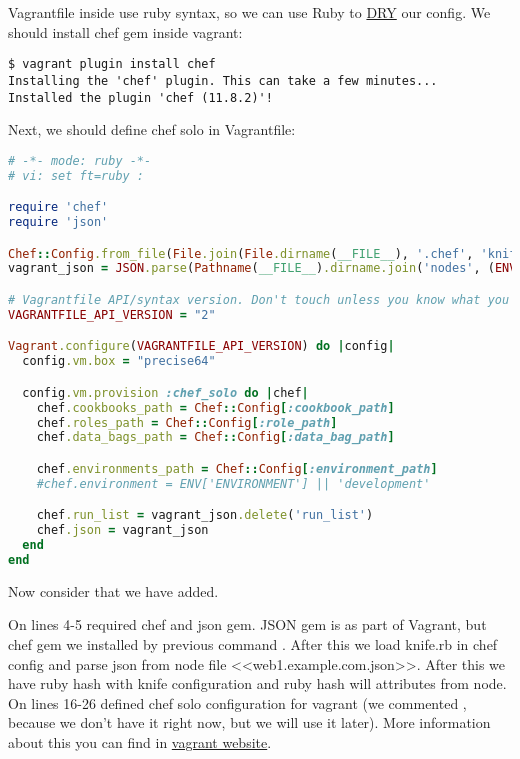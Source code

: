 Vagrantfile inside use ruby syntax, so we can use Ruby to \href{http://en.wikipedia.org/wiki/Dont\_repeat\_yourself}{DRY} our config. We should install chef gem inside vagrant:

\begin{lstlisting}[label=lst:my-cloud-vagrant6]
$ vagrant plugin install chef
Installing the 'chef' plugin. This can take a few minutes...
Installed the plugin 'chef (11.8.2)'!
\end{lstlisting}

Next, we should define chef solo in Vagrantfile:

\begin{lstlisting}[language=Ruby,label=lst:my-cloud-vagrant7,title=my-cloud/nodes/Vagrantfile]
# -*- mode: ruby -*-
# vi: set ft=ruby :

require 'chef'
require 'json'

Chef::Config.from_file(File.join(File.dirname(__FILE__), '.chef', 'knife.rb'))
vagrant_json = JSON.parse(Pathname(__FILE__).dirname.join('nodes', (ENV['NODE'] || 'web1.example.com.json')).read)

# Vagrantfile API/syntax version. Don't touch unless you know what you're doing!
VAGRANTFILE_API_VERSION = "2"

Vagrant.configure(VAGRANTFILE_API_VERSION) do |config|
  config.vm.box = "precise64"

  config.vm.provision :chef_solo do |chef|
    chef.cookbooks_path = Chef::Config[:cookbook_path]
    chef.roles_path = Chef::Config[:role_path]
    chef.data_bags_path = Chef::Config[:data_bag_path]

    chef.environments_path = Chef::Config[:environment_path]
    #chef.environment = ENV['ENVIRONMENT'] || 'development'

    chef.run_list = vagrant_json.delete('run_list')
    chef.json = vagrant_json
  end
end
\end{lstlisting}

Now consider that we have added.

On lines 4-5 required chef and json gem. JSON gem is as part of Vagrant, but chef gem we installed by previous command . After this we load knife.rb in chef config and parse json from node file <<web1.example.com.json>>. After this we have  ruby hash with knife configuration and  ruby hash will attributes from node. On lines 16-26 defined chef solo configuration for vagrant (we commented , because we don't have it right now, but we will use it later). More information about this you can find in \href{http://docs.vagrantup.com/v2/provisioning/chef\_solo.html}{vagrant website}.

